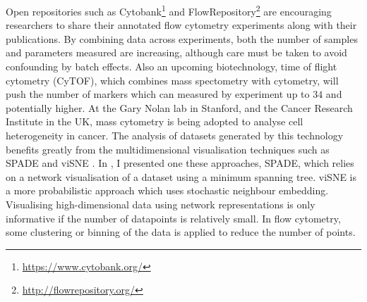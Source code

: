 Open repositories such as Cytobank\footnote{\url{https://www.cytobank.org/}} and FlowRepository\footnote{\url{http://flowrepository.org/}} \citep{Spidlen:2012hk} are encouraging researchers to share their annotated flow cytometry experiments along with their publications.
By combining data across experiments, both the number of samples and parameters measured are increasing, although care must be taken to avoid confounding by batch effects.
Also an upcoming biotechnology, time of flight cytometry (CyTOF), which combines mass spectometry with cytometry, will push the number of markers which can measured by experiment up to $34$ and potentially higher.
At the Gary Nolan lab in Stanford, and the Cancer Research Institute in the UK, mass cytometry is being adopted to analyse cell heterogeneity in cancer.
The analysis of datasets generated by this technology benefits greatly from the multidimensional visualisation techniques such as \gls{SPADE} \citep{Simonds:2011jh} and \gls{viSNE} \citep{Amir:2013jp}.
In , I presented one these approaches, \gls{SPADE}, which relies on a network visualisation of a dataset using a minimum spanning tree.
\gls{viSNE} is a more probabilistic approach which uses stochastic neighbour embedding.
Visualising high-dimensional data using network representations is only informative if the number of datapoints is relatively small.
In flow cytometry, some clustering or binning of the data is applied to reduce the number of points.  


